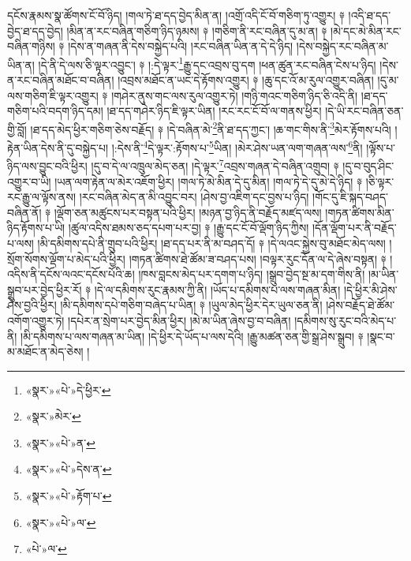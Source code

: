 དངོས་རྣམས་སྣ་ཚོགས་ངོ་བོ་ཉིད། །གལ་ཏེ་ཐ་དད་བྱེད་མིན་ན། །འགྲོ་འདི་ངོ་བོ་གཅིག་ཏུ་འགྱུར། ༈ །འདི་ཐ་དད་བྱེད་ཐ་དད་བྱེད། །མིན་ན་རང་བཞིན་གཅིག་ཉིད་ཉམས། ༈ །གཅིག་ནི་རང་བཞིན་དུ་མ་ན། ༈ །མེ་དང་མེ་མིན་རང་བཞིན་གཉིས། ༈ །དེས་ན་གཞན་ནི་དེས་བསྐྱེད་པའི། །རང་བཞིན་ཡིན་ན་དེ་དེ་ཉིད། །དེས་བསྐྱེད་རང་བཞིན་མ་ཡིན་ན། །དེ་ནི་དེ་ལས་ཅི་ལྟར་འབྱུང་། ༈ །:དེ་ལྟར་\footnote{«སྣར་»«པེ་»དེ་ཕྱིར་}རྒྱུ་དང་འབྲས་བུ་དག །ཕན་ཚུན་རང་བཞིན་ངེས་པ་ཉིད། །དེས་ན་རང་བཞིན་མཐོང་བ་བཞིན། །འབྲས་མཐོང་ན་ཡང་དེ་རྟོགས་འགྱུར། ༈ །ཆུ་དང་འོ་མ་རུལ་འགྱུར་བཞིན། །དུ་མ་ལས་གཅིག་ཇི་ལྟར་འགྱུར། ༈ །གཤེར་ནུས་གང་ལས་རུལ་འགྱུར་ཏེ། །གཉི་གའང་གཅིག་ཉིད་ཅི་འདི་ནི། །ཐ་དད་གཅིག་པའི་བདག་ཉིད་དམ། །ཐ་དད་གཤེར་ཉིད་ཇི་ལྟར་ཡིན། །རང་རང་ངོ་བོ་ལ་གནས་ཕྱིར། །དེ་ཡི་རང་བཞིན་ཅན་གྱི་བློ། །ཐ་དད་མེད་ཕྱིར་གཅིག་ཅེས་བརྗོད། ༈ །དེ་བཞིན་མེ་\footnote{«སྣར་»མེར་}ནི་ཐ་དད་ཀྱང་། །ཆ་གང་གིས་ནི་\footnote{«སྣར་»«པེ་»ན་}མེར་རྟོགས་པའི། །རྟེན་ཡིན་དེས་ནི་དུ་བསྐྱེད་པ། །:དེས་ནི་\footnote{«སྣར་»«པེ་»དེས་ན་}དེ་ལྟར་:རྟོགས་པ་\footnote{«སྣར་»«པེ་»རྟོག་པ་}ཡིན། །མེར་ཤེས་ཡན་ལག་གཞན་ལས་\footnote{«སྣར་»«པེ་»ལ་}ནི། །ལྟོས་པ་ཉིད་ལས་བྱུང་བའི་ཕྱིར། །དུ་བ་དེ་ལ་འཁྲུལ་མེད་ཅན། །དེ་ལྟར་\footnote{«པེ་»ལ་}འབྲས་གཞན་དེ་བཞིན་འགྲུབ། ༈ །དུ་བ་བུད་ཤིང་འགྱུར་བ་ཡི། །ཡན་ལག་རྟེན་ལ་མེར་འཇོག་ཕྱིར། །གལ་ཏེ་མེ་མིན་དེ་དུ་མིན། །གལ་ཏེ་དེ་དུ་མེ་དེ་ཉིད། ༈ །ཅི་ལྟར་རང་རྒྱུ་ལ་ལྟོས་ནས། །རང་བཞིན་མེད་ན་མི་འབྱུང་བར། །ཤེས་བྱ་འཇིག་དང་བྱས་པ་ཉིད། །གོང་དུ་ཇི་སྐད་བཤད་བཞིན་ནོ། ༈ །ལྡོག་ཅན་མཚུངས་པར་བསྟན་པའི་ཕྱིར། །མཉན་བྱ་ཉིད་ནི་བརྗོད་མཛད་ལས། །གཏན་ཚིགས་མིན་ཉིད་རྟོགས་པ་ཡི། །ཚུལ་འདིས་ཐམས་ཅད་དཔག་པར་བྱ། ༈ །རྒྱུ་དང་ངོ་བོ་ལྡོག་ཉིད་ཀྱིས། །དོན་ལྡོག་པར་ནི་བརྗོད་པ་ལས། །མི་དམིགས་དཔེ་ནི་གྲུབ་པའི་ཕྱིར། །ཐ་དད་པར་ནི་མ་བཤད་དོ། ༈ །དེ་ལའང་སྐྱེས་བུ་མཐོང་མེད་ལས། །སྲོག་སོགས་ལྡོག་པ་མེད་པའི་ཕྱིར། །གཏན་ཚིགས་ཐེ་ཚོམ་ཟ་བཤད་པས། །བལྟར་རུང་དོན་ལ་དེ་ཞེས་བསྟན། ༈ །འདིས་ནི་དངོས་ལའང་དངོས་པོའི་ཆ། །ཁས་བླངས་མེད་པར་དགག་པ་ཉིད། །སྒྲུབ་བྱེད་སྔ་མ་དག་གིས་ནི། །མ་ཡིན་སྒྲུབ་པར་བྱེད་ཕྱིར་རོ། ༈ །དེ་ལ་དམིགས་རུང་རྣམས་ཀྱི་ནི། །ཡོད་པ་དམིགས་པ་ལས་གཞན་མིན། །དེ་ཕྱིར་མི་ཤེས་ཤེས་བྱའི་ཕྱིར། །མི་དམིགས་དཔེ་གཅིག་བཞེད་པ་ཡིན། ༈ །ཡུལ་མེད་ཕྱིར་དེར་ཡུལ་ཅན་ནི། །ཤེས་བརྗོད་ཐེ་ཚོམ་འགོག་འགྱུར་ཏེ། །དཔེར་ན་སྲེག་པར་བྱེད་མིན་ཕྱིར། །མེ་མ་ཡིན་ཞེས་བྱ་བ་བཞིན། །དམིགས་སུ་རུང་བའི་མེད་པ་ནི། །མི་དམིགས་པ་ལས་གཞན་མ་ཡིན། །དེ་ཕྱིར་དེ་ཡོད་པ་ལས་དེའི། །རྒྱུ་མཚན་ཅན་གྱི་སྒྲ་ཤེས་སྒྲུབ། ༈ །སྣང་བ་མ་མཐོང་ན་མེད་ཅེས། །
